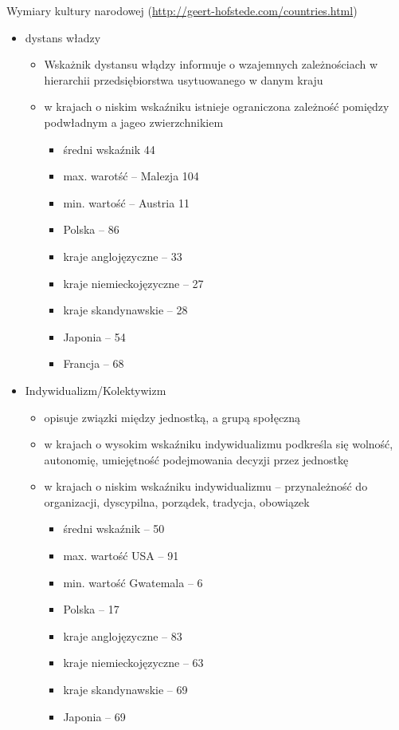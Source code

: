 \documentclass[a4paper,10pt]{report}
\begin{document}
\noindent Wymiary kultury narodowej (\url{http://geert-hofstede.com/countries.html})

\begin{itemize}
	\item dystans władzy
	\begin{itemize}
		\item Wskażnik dystansu włądzy informuje o wzajemnych zależnościach w hierarchii przedsiębiorstwa usytuowanego w danym kraju
		\item w krajach o niskim wskaźniku istnieje ograniczona zależność pomiędzy podwładnym a jageo zwierzchnikiem
		\begin{itemize}
			\item średni wskaźnik 44
			\item max. warotść -- Malezja 104
			\item min. wartość -- Austria 11
			\item Polska -- 86
			\item kraje anglojęzyczne -- 33
			\item kraje niemieckojęzyczne -- 27
			\item kraje skandynawskie -- 28
			\item Japonia -- 54
			\item Francja -- 68
		\end{itemize}
	\end{itemize}
	\item Indywidualizm/Kolektywizm
	\begin{itemize}
		\item opisuje związki między jednostką, a grupą społęczną
		\item w krajach o wysokim wskaźniku indywidualizmu podkreśla się wolność, autonomię, umiejętność podejmowania decyzji przez jednostkę
		\item w krajach o niskim wskaźniku indywidualizmu -- przynależność do organizacji, dyscypilna, porządek, tradycja, obowiązek
		\begin{itemize}
			\item średni wskaźnik -- 50
			\item max. wartość USA -- 91
			\item min. wartość Gwatemala -- 6
			\item Polska -- 17
			\item kraje anglojęzyczne -- 83
			\item kraje niemieckojęzyczne -- 63
			\item kraje skandynawskie -- 69
			\item Japonia -- 69

\end{itemize}
\end{itemize}
\end{itemize}
\end{document}
